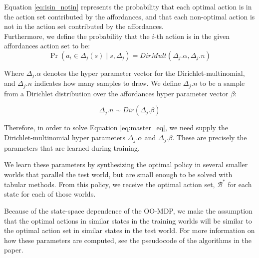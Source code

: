 \documentclass[11pt]{article}
\begin{document}
\noindent Equation \ref{eq:isin_notin} represents the probability that each optimal action is in the action set contributed by the affordances, and that each non-optimal action is not in the action set contributed by the affordances. \\

\noindent Furthermore, we define the probability that the $i$-th action is in the given affordances action set to be:
\begin{equation}
\Pr(a_i \in \Delta_j(s) \mid s, \Delta_j) = DirMult(\Delta_j.\alpha, \Delta_j.n)
\end{equation}

\noindent Where $\Delta_j.\alpha$ denotes the hyper parameter vector for the Dirichlet-multinomial, and $\Delta_j.n$ indicates how many samples to draw. We define $\Delta_j.n$ to be a sample from a Dirichlet distribution over the affordances hyper parameter vector $\beta$:

\begin{equation}
\Delta_j.n \sim Dir(\Delta_j.\beta)
\end{equation}

\noindent Therefore, in order to solve Equation \ref{eq:master_eq}, we need supply the Dirichlet-multinomial hyper parameters $\Delta_j.\alpha$ and $\Delta_j.\beta$. These are precisely the parameters that are learned during training.

\noindent We learn these parameters by synthesizing the optimal policy in several smaller worlds that parallel the test world, but are small enough to be solved with tabular methods. From this policy, we receive the optimal action set, $\mathcal{B}^*$ for each state for each of those worlds.

\noindent Because of the state-space dependence of the OO-MDP, we make the assumption that the optimal actions in similar states in the training worlds will be similar to the optimal action set in similar states in the test world. For more information on how these parameters are computed, see the pseudocode of the algorithms in the paper.

{\small

  
}
\end{document}
